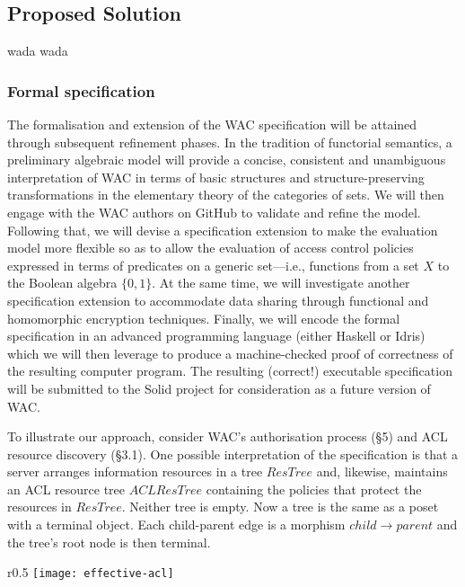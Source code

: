 \subsection{Proposed Solution}

wada wada

\subsubsection{Formal specification}
The formalisation and extension of the WAC specification will be
attained through subsequent refinement phases. In the tradition of
functorial semantics\cite{lawvere1963functorial, bonchi2017functorial},
a preliminary algebraic model will provide a concise, consistent and
unambiguous interpretation of WAC in terms of basic structures and
structure-preserving transformations in the elementary theory of the
categories of sets\cite{lawvere1964elementary, leinster2014rethinking}.
We will then engage with the WAC authors on GitHub to validate and
refine the model. Following that, we will devise a specification extension
to make the evaluation model more flexible so as to allow the evaluation
of access control policies expressed in terms of predicates on a generic
set---i.e., functions from a set $X$ to the Boolean algebra $\{0, 1\}$.
At the same time, we will investigate another specification extension
to accommodate data sharing through functional and homomorphic encryption
techniques. Finally, we will encode the formal specification in an
advanced programming language (either Haskell\cite{peytonjones:h98}
or Idris\cite{brady2013idris}) which we will then leverage to produce
a machine-checked proof of correctness of the resulting computer program.
The resulting (correct!) executable specification will be submitted to
the Solid project for consideration as a future version of WAC.

To illustrate our approach, consider WAC's authorisation process (\S 5)
and ACL resource discovery (\S 3.1). One possible interpretation of
the specification is that a server arranges information resources
in a tree $ResTree$ and, likewise, maintains an ACL resource tree
$ACLResTree$ containing the policies that protect the resources in
$ResTree$. Neither tree is empty. Now a tree is the same as a poset
with a terminal object. Each child-parent edge is a morphism
$child \rightarrow parent$ and the tree's root node is then terminal.

\begin{wrapfigure}{r}{0.5\textwidth}
  \texttt{[image: effective-acl]}
\end{wrapfigure}

